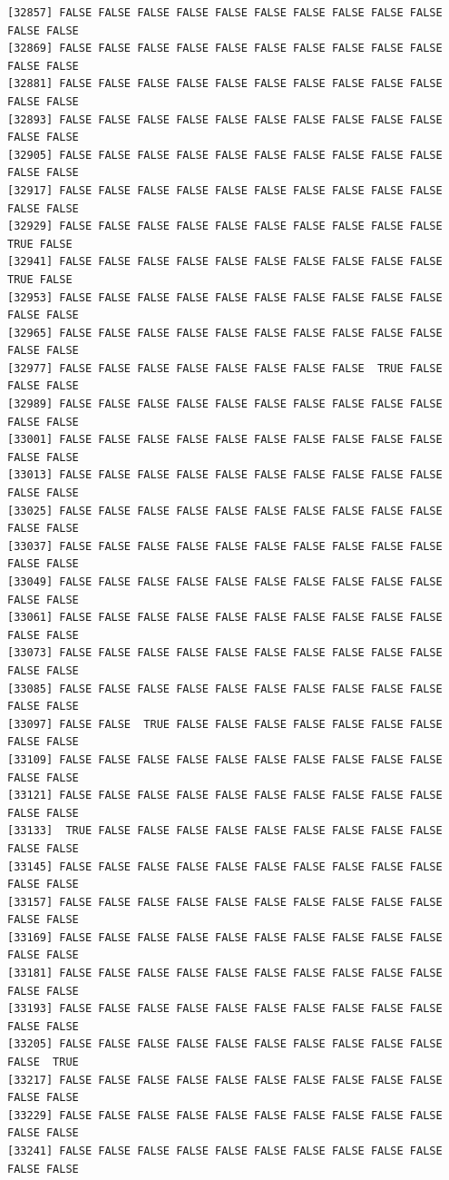 \documentclass[
  a4paper,
  DIV=11,
  numbers=noendperiod]{scrartcl}
\begin{document}
\begin{verbatim}
[32857] FALSE FALSE FALSE FALSE FALSE FALSE FALSE FALSE FALSE FALSE FALSE FALSE
[32869] FALSE FALSE FALSE FALSE FALSE FALSE FALSE FALSE FALSE FALSE FALSE FALSE
[32881] FALSE FALSE FALSE FALSE FALSE FALSE FALSE FALSE FALSE FALSE FALSE FALSE
[32893] FALSE FALSE FALSE FALSE FALSE FALSE FALSE FALSE FALSE FALSE FALSE FALSE
[32905] FALSE FALSE FALSE FALSE FALSE FALSE FALSE FALSE FALSE FALSE FALSE FALSE
[32917] FALSE FALSE FALSE FALSE FALSE FALSE FALSE FALSE FALSE FALSE FALSE FALSE
[32929] FALSE FALSE FALSE FALSE FALSE FALSE FALSE FALSE FALSE FALSE  TRUE FALSE
[32941] FALSE FALSE FALSE FALSE FALSE FALSE FALSE FALSE FALSE FALSE  TRUE FALSE
[32953] FALSE FALSE FALSE FALSE FALSE FALSE FALSE FALSE FALSE FALSE FALSE FALSE
[32965] FALSE FALSE FALSE FALSE FALSE FALSE FALSE FALSE FALSE FALSE FALSE FALSE
[32977] FALSE FALSE FALSE FALSE FALSE FALSE FALSE FALSE  TRUE FALSE FALSE FALSE
[32989] FALSE FALSE FALSE FALSE FALSE FALSE FALSE FALSE FALSE FALSE FALSE FALSE
[33001] FALSE FALSE FALSE FALSE FALSE FALSE FALSE FALSE FALSE FALSE FALSE FALSE
[33013] FALSE FALSE FALSE FALSE FALSE FALSE FALSE FALSE FALSE FALSE FALSE FALSE
[33025] FALSE FALSE FALSE FALSE FALSE FALSE FALSE FALSE FALSE FALSE FALSE FALSE
[33037] FALSE FALSE FALSE FALSE FALSE FALSE FALSE FALSE FALSE FALSE FALSE FALSE
[33049] FALSE FALSE FALSE FALSE FALSE FALSE FALSE FALSE FALSE FALSE FALSE FALSE
[33061] FALSE FALSE FALSE FALSE FALSE FALSE FALSE FALSE FALSE FALSE FALSE FALSE
[33073] FALSE FALSE FALSE FALSE FALSE FALSE FALSE FALSE FALSE FALSE FALSE FALSE
[33085] FALSE FALSE FALSE FALSE FALSE FALSE FALSE FALSE FALSE FALSE FALSE FALSE
[33097] FALSE FALSE  TRUE FALSE FALSE FALSE FALSE FALSE FALSE FALSE FALSE FALSE
[33109] FALSE FALSE FALSE FALSE FALSE FALSE FALSE FALSE FALSE FALSE FALSE FALSE
[33121] FALSE FALSE FALSE FALSE FALSE FALSE FALSE FALSE FALSE FALSE FALSE FALSE
[33133]  TRUE FALSE FALSE FALSE FALSE FALSE FALSE FALSE FALSE FALSE FALSE FALSE
[33145] FALSE FALSE FALSE FALSE FALSE FALSE FALSE FALSE FALSE FALSE FALSE FALSE
[33157] FALSE FALSE FALSE FALSE FALSE FALSE FALSE FALSE FALSE FALSE FALSE FALSE
[33169] FALSE FALSE FALSE FALSE FALSE FALSE FALSE FALSE FALSE FALSE FALSE FALSE
[33181] FALSE FALSE FALSE FALSE FALSE FALSE FALSE FALSE FALSE FALSE FALSE FALSE
[33193] FALSE FALSE FALSE FALSE FALSE FALSE FALSE FALSE FALSE FALSE FALSE FALSE
[33205] FALSE FALSE FALSE FALSE FALSE FALSE FALSE FALSE FALSE FALSE FALSE  TRUE
[33217] FALSE FALSE FALSE FALSE FALSE FALSE FALSE FALSE FALSE FALSE FALSE FALSE
[33229] FALSE FALSE FALSE FALSE FALSE FALSE FALSE FALSE FALSE FALSE FALSE FALSE
[33241] FALSE FALSE FALSE FALSE FALSE FALSE FALSE FALSE FALSE FALSE FALSE FALSE

\end{verbatim}
\end{document}
